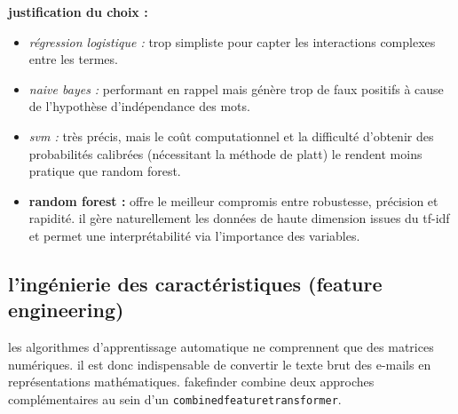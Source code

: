 \documentclass[12pt,a4paper]{report}
\begin{document}
\textbf{justification du choix :}
\begin{itemize}
    \item \textit{régression logistique :} trop simpliste pour capter les interactions complexes entre les termes.
    \item \textit{naive bayes :} performant en rappel mais génère trop de faux positifs à cause de l'hypothèse d'indépendance des mots.
    \item \textit{svm :} très précis, mais le coût computationnel et la difficulté d'obtenir des probabilités calibrées (nécessitant la méthode de platt) le rendent moins pratique que random forest.
    \item \textbf{random forest :} offre le meilleur compromis entre robustesse, précision et rapidité. il gère naturellement les données de haute dimension issues du tf-idf et permet une interprétabilité via l'importance des variables.
\end{itemize}

\subsection{l'ingénierie des caractéristiques (feature engineering)}
les algorithmes d'apprentissage automatique ne comprennent que des matrices numériques. il est donc indispensable de convertir le texte brut des e-mails en représentations mathématiques. fakefinder combine deux approches complémentaires au sein d'un \texttt{combinedfeaturetransformer}.
\end{document}
